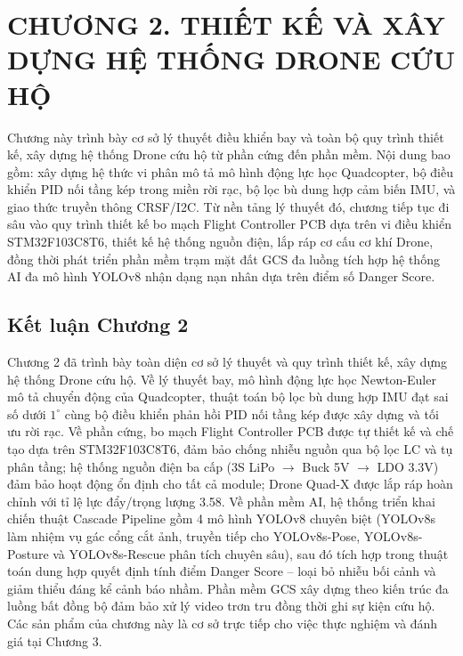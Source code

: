 \section*{CHƯƠNG 2. THIẾT KẾ VÀ XÂY DỰNG HỆ THỐNG DRONE CỨU HỘ}
\setcounter{section}{2}
\setcounter{subsection}{0}
\setcounter{figure}{0}
\setcounter{table}{0}

Chương này trình bày cơ sở lý thuyết điều khiển bay và toàn bộ quy trình thiết kế, xây dựng hệ thống Drone cứu hộ từ phần cứng đến phần mềm. Nội dung bao gồm: xây dựng hệ thức vi phân mô tả mô hình động lực học Quadcopter, bộ điều khiển PID nối tầng kép trong miền rời rạc, bộ lọc bù dung hợp cảm biến IMU, và giao thức truyền thông CRSF/I2C. Từ nền tảng lý thuyết đó, chương tiếp tục đi sâu vào quy trình thiết kế bo mạch Flight Controller PCB dựa trên vi điều khiển STM32F103C8T6, thiết kế hệ thống nguồn điện, lắp ráp cơ cấu cơ khí Drone, đồng thời phát triển phần mềm trạm mặt đất GCS đa luồng tích hợp hệ thống AI đa mô hình YOLOv8 nhận dạng nạn nhân dựa trên điểm số Danger Score.



\bigskip


\bigskip


\subsection*{Kết luận Chương 2}

Chương 2 đã trình bày toàn diện cơ sở lý thuyết và quy trình thiết kế, xây dựng hệ thống Drone cứu hộ. Về lý thuyết bay, mô hình động lực học Newton-Euler mô tả chuyển động của Quadcopter, thuật toán bộ lọc bù dung hợp IMU đạt sai số dưới $1^\circ$ cùng bộ điều khiển phản hồi PID nối tầng kép được xây dựng và tối ưu rời rạc. Về phần cứng, bo mạch Flight Controller PCB được tự thiết kế và chế tạo dựa trên STM32F103C8T6, đảm bảo chống nhiễu nguồn qua bộ lọc LC và tụ phân tầng; hệ thống nguồn điện ba cấp (3S LiPo $\rightarrow$ Buck 5V $\rightarrow$ LDO 3.3V) đảm bảo hoạt động ổn định cho tất cả module; Drone Quad-X được lắp ráp hoàn chỉnh với tỉ lệ lực đẩy/trọng lượng 3.58. Về phần mềm AI, hệ thống triển khai chiến thuật Cascade Pipeline gồm 4 mô hình YOLOv8 chuyên biệt (YOLOv8s làm nhiệm vụ gác cổng cắt ảnh, truyền tiếp cho YOLOv8s-Pose, YOLOv8s-Posture và YOLOv8s-Rescue phân tích chuyên sâu), sau đó tích hợp trong thuật toán dung hợp quyết định tính điểm Danger Score -- loại bỏ nhiễu bối cảnh và giảm thiểu đáng kể cảnh báo nhầm. Phần mềm GCS xây dựng theo kiến trúc đa luồng bất đồng bộ đảm bảo xử lý video trơn tru đồng thời ghi sự kiện cứu hộ. Các sản phẩm của chương này là cơ sở trực tiếp cho việc thực nghiệm và đánh giá tại Chương 3.
